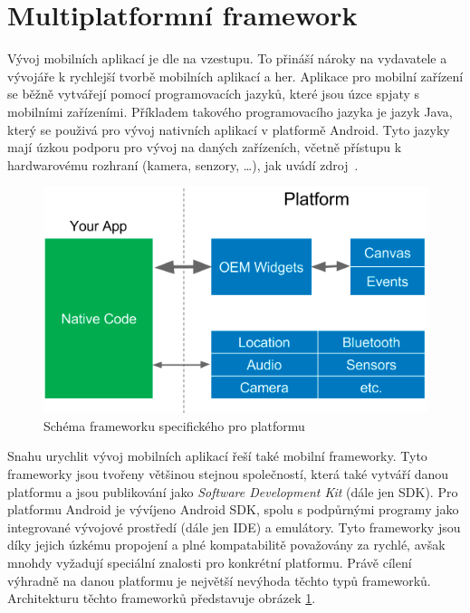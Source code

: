 \section{Multiplatformní framework}

Vývoj mobilních aplikací je dle \cite{wepc_video_game_statistics} na vzestupu.
To přináší nároky na vydavatele a vývojáře k rychlejší tvorbě mobilních
aplikací a her. 
Aplikace pro mobilní zařízení se běžně vytvářejí pomocí programovacích jazyků,
které jsou úzce spjaty s mobilními zařízeními.
Příkladem takového programovacího jazyka je jazyk Java,
který se použivá pro vývoj nativních aplikací v platformě Android.
Tyto jazyky mají úzkou podporu pro vývoj na daných zařízeních,
včetně přístupu k hardwarovému rozhraní (kamera, senzory, \dots{}),
jak uvádí zdroj~\cite{dashmagazine_mobile_frameworks}. 

\begin{figure}[ht!]
    \centering
    \includegraphics[width=\linewidth]{assets/technology-research/framework/platform_sdk.png}
    \caption{Schéma frameworku specifického pro platformu  \cite{hackernoon_flutter}}
    \label{fig:framework_platform}
\end{figure}

Snahu urychlit vývoj mobilních aplikací řeší také mobilní frameworky.
Tyto frameworky jsou tvořeny většinou stejnou společností,
která také vytváří danou platformu
a jsou publikování jako \emph{Software Development Kit} (dále jen SDK).
\cite{dashmagazine_mobile_frameworks}
Pro platformu Android je vývíjeno Android SDK,
spolu s podpůrnými programy jako integrované vývojové prostředí
(dále jen IDE) a emulátory.
Tyto frameworky jsou díky jejich úzkému propojení a plné kompatabilitě
považovány za rychlé,
avšak mnohdy vyžadují speciální znalosti pro konkrétní platformu.
Právě cílení výhradně na danou platformu je největší nevýhoda těchto typů
frameworků.
Architekturu těchto frameworků představuje obrázek \ref{fig:framework_platform}.

